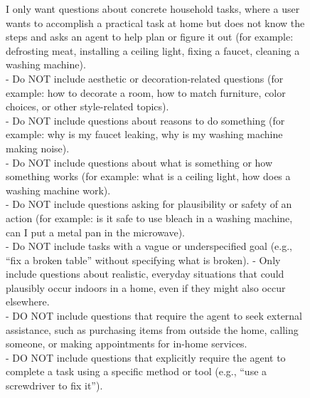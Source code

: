 









\begin{figure}[htbp]
\begin{tcolorbox}[
    colback=black!5!white,
    colframe=black,
    title=Query Filtering Prompt,
    fonttitle=\bfseries,
    colbacktitle=black!20!white,
    coltitle=black,
    boxrule=1.5pt,
    arc=5pt,
    boxsep=5pt,
    left=12pt,
    right=12pt,
    top=12pt,
    bottom=12pt
]

I only want questions about concrete household tasks, where a user wants to accomplish a practical task at home but does not know the steps and asks an agent to help plan or figure it out (for example: defrosting meat, installing a ceiling light, fixing a faucet, cleaning a washing machine).\\

- Do NOT include aesthetic or decoration-related questions (for example: how to decorate a room, how to match furniture, color choices, or other style-related topics).\\
- Do NOT include questions about reasons to do something (for example: why is my faucet leaking, why is my washing machine making noise).\\
- Do NOT include questions about what is something or how something works (for example: what is a ceiling light, how does a washing machine work).\\
- Do NOT include questions asking for plausibility or safety of an action (for example: is it safe to use bleach in a washing machine, can I put a metal pan in the microwave).\\
- Do NOT include tasks with a vague or underspecified goal (e.g., ``fix a broken table'' without specifying what is broken).
- Only include questions about realistic, everyday situations that could plausibly occur indoors in a home, even if they might also occur elsewhere.\\
- DO NOT include questions that require the agent to seek external assistance, such as purchasing items from outside the home, calling someone, or making appointments for in-home services.\\
- DO NOT include questions that explicitly require the agent to complete a task using a specific method or tool (e.g., ``use a screwdriver to fix it'').\\


\end{tcolorbox}
\end{figure}
